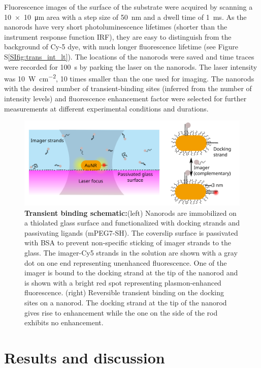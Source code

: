 Fluorescence images of the surface of the substrate were acquired by scanning a \SI[product-units=power]{10x10}{\um} area with a step size of \SI{50}{\nm} and a dwell time of \SI{1}{\ms}.
As the nanorods have very short photoluminescence lifetimes (shorter than the instrument response function IRF), they are easy to distinguish from the background of Cy-5 dye, with much longer fluorescence lifetime (see Figure S\ref{SIfig:trans_int_lt}).
The locations of the nanorods were saved and time traces were recorded for \SI{100}{\s} by parking the laser on the nanorods.
The laser intensity was \SI[per-mode=repeated-symbol]{10}{\watt\per\cm\squared}, 10 times smaller than the one used for imaging.
The nanorods with the desired number of transient-binding sites (inferred from the number of intensity levels) and fluorescence enhancement factor were selected for further measurements at different experimental conditions and durations.
\begin{figure}
	\centering
	\includegraphics[width=\linewidth]{scheme}
	\caption{\textbf{Transient binding schematic:}(left) Nanorods are immobilized on a thiolated glass surface and functionalized with docking strands and passivating ligands (mPEG7-SH).
	The coverslip surface is passivated with BSA to prevent non-specific sticking of imager strands to the glass.
	The imager-Cy5 strands in the solution  are shown with a gray dot on one end representing unenhanced fluorescence.
	One of the imager is bound to the docking strand at the tip of the nanorod and is shown with a bright red spot representing plasmon-enhanced fluorescence.
	(right) Reversible transient binding on the docking sites on a nanorod. The docking strand at the tip of the nanorod gives rise to enhancement while the one on the side of the rod exhibits no enhancement.}
  	\label{sch_trans:setup}
\end{figure}


\section{Results and discussion}
